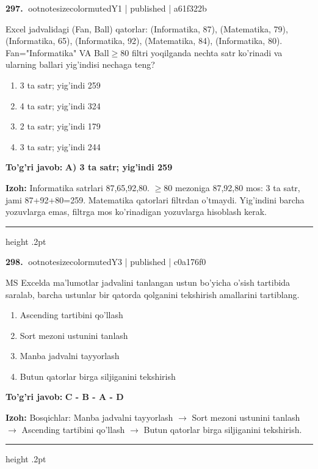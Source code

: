 \documentclass[10pt,a4paper]{article}
\begin{document}
\textbf{\color{ink}297.} {ootnotesizecolor{muted}Y1 | published | a61f322b}
\par
Excel jadvalidagi (Fan, Ball) qatorlar: (Informatika, 87), (Matematika, 79), (Informatika, 65), (Informatika, 92), (Matematika, 84), (Informatika, 80). Fan="Informatika" VA Ball\ensuremath{\geq}80 filtri yoqilganda nechta satr ko'rinadi va ularning ballari yig'indisi nechaga teng?
\begin{enumerate}[label=\Alph*),leftmargin=9mm]
\item 3 ta satr; yig'indi 259
\item 4 ta satr; yig'indi 324
\item 2 ta satr; yig'indi 179
\item 3 ta satr; yig'indi 244
\end{enumerate}
\begin{tcolorbox}[enhanced,breakable,colback=teal!4,colframe=teal!55!black,boxrule=0.45pt,arc=1.2mm,left=2.8mm,right=2.8mm,top=2mm,bottom=2mm]
\textbf{\color{teal}To'g'ri javob:} \textbf{A) 3 ta satr; yig'indi 259}
\par\smallskip
\textbf{Izoh:} Informatika satrlari 87,65,92,80. \ensuremath{\geq}80 mezoniga 87,92,80 mos: 3 ta satr, jami 87+92+80=259. Matematika qatorlari filtrdan o'tmaydi. Yig'indini barcha yozuvlarga emas, filtrga mos ko'rinadigan yozuvlarga hisoblash kerak.
\end{tcolorbox}
\vspace{2mm}\hrule height .2pt\vspace{2mm}

\textbf{\color{ink}298.} {ootnotesizecolor{muted}Y3 | published | c0a176f0}
\par
MS Excelda ma'lumotlar jadvalini tanlangan ustun bo'yicha o'sish tartibida saralab, barcha ustunlar bir qatorda qolganini tekshirish amallarini tartiblang.
\begin{enumerate}[label=\Alph*),leftmargin=9mm]
\item Ascending tartibini qo'llash
\item Sort mezoni ustunini tanlash
\item Manba jadvalni tayyorlash
\item Butun qatorlar birga siljiganini tekshirish
\end{enumerate}
\begin{tcolorbox}[enhanced,breakable,colback=teal!4,colframe=teal!55!black,boxrule=0.45pt,arc=1.2mm,left=2.8mm,right=2.8mm,top=2mm,bottom=2mm]
\textbf{\color{teal}To'g'ri javob:} \textbf{C - B - A - D}
\par\smallskip
\textbf{Izoh:} Bosqichlar: Manba jadvalni tayyorlash \ensuremath{\rightarrow} Sort mezoni ustunini tanlash \ensuremath{\rightarrow} Ascending tartibini qo'llash \ensuremath{\rightarrow} Butun qatorlar birga siljiganini tekshirish.
\end{tcolorbox}
\vspace{2mm}\hrule height .2pt\vspace{2mm}
\end{document}
